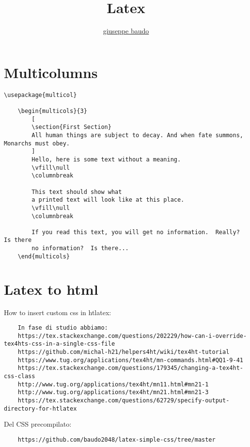 \documentclass[a4paper,10pt]{article}
\title{Latex}
\author{\href{http://www.baudo.hol.es}{giuseppe baudo}}
\begin{document}
  


\maketitle

\section*{Multicolumns}

\begin{verbatim}
\usepackage{multicol}

	\begin{multicols}{3}
		[
		\section{First Section}
		All human things are subject to decay. And when fate summons, Monarchs must obey.
		]
		Hello, here is some text without a meaning.  
		\vfill\null			
		\columnbreak
		
		This text should show what 
		a printed text will look like at this place.
		\vfill\null
		\columnbreak		
		
		If you read this text, you will get no information.  Really?  Is there 
		no information?  Is there...
	\end{multicols}
\end{verbatim}

\section*{Latex to html}
How to insert custom css in htlatex: 

\begin{verbatim}
	In fase di studio abbiamo:
	https://tex.stackexchange.com/questions/202229/how-can-i-override-tex4hts-css-in-a-single-css-file
	https://github.com/michal-h21/helpers4ht/wiki/tex4ht-tutorial
	https://www.tug.org/applications/tex4ht/mn-commands.html#QQ1-9-41
	https://tex.stackexchange.com/questions/179345/changing-a-tex4ht-css-class
	http://www.tug.org/applications/tex4ht/mn11.html#mn21-1
	http://www.tug.org/applications/tex4ht/mn21.html#mn21-3	
	https://tex.stackexchange.com/questions/62729/specify-output-directory-for-htlatex
\end{verbatim}

Del CSS precompilato:
\begin{verbatim}
	https://github.com/baudo2048/latex-simple-css/tree/master
\end{verbatim}
\end{document}
